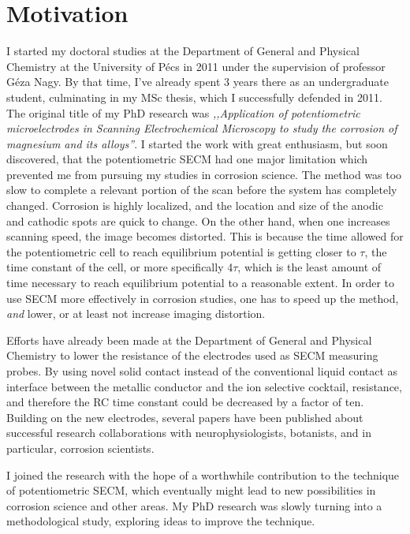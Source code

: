 \chapter*{Motivation}
I started my doctoral studies at the Department of General and Physical Chemistry at the University of Pécs in 2011 under the supervision of professor Géza Nagy.
By that time, I've already spent 3 years there as an undergraduate student, culminating in my MSc thesis, which I successfully defended in 2011.
The original title of my PhD research was \emph{,,Application of potentiometric microelectrodes in Scanning Electrochemical Microscopy to study the corrosion of magnesium and its alloys''}.
I started the work with great enthusiasm, but soon discovered, that the potentiometric SECM had one major limitation which prevented me from pursuing my studies in corrosion science.
The method was too slow to complete a relevant portion of the scan before the system has completely changed.
Corrosion is highly localized, and the location and size of the anodic and cathodic spots are quick to change.
On the other hand, when one increases scanning speed, the image becomes distorted.
This is because the time allowed for the potentiometric cell to reach equilibrium potential is getting closer to $\tau$, the time constant of the cell, or more specifically 4$\tau$, which is the least amount of time necessary to reach equilibrium potential to a reasonable extent.
In order to use SECM more effectively in corrosion studies, one has to speed up the method, \emph{and} lower, or at least not increase imaging distortion.

Efforts have already been made at the Department of General and Physical Chemistry to lower the resistance of the electrodes used as SECM measuring probes.
By using novel solid contact instead of the conventional liquid contact as interface between the metallic conductor and the ion selective cocktail, resistance, and therefore the RC time constant could be decreased by a factor of ten.
Building on the new electrodes, several papers have been published about successful research collaborations with neurophysiologists, botanists, and in particular, corrosion scientists.

I joined the research with the hope of a worthwhile contribution to the technique of potentiometric SECM, which eventually might lead to new possibilities in corrosion science and other areas.
My PhD research was slowly turning into a methodological study, exploring ideas to improve the technique.

